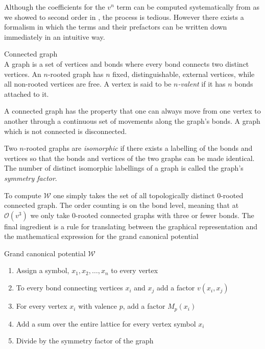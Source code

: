 Although the coefficients for the $v^n$ term can be computed systematically from
  as we showed to second order in
, the process is tedious. However there
exists a formalism in which the terms and their prefactors can be written down
immediately in an intuitive way.
%
\begin{definition}{Connected graph}\label{def:graph}\\
  A graph is a set of vertices and bonds where every bond connects two distinct
  vertices. An $n$-rooted graph has $n$ fixed, distinguishable, external
  vertices, while all non-rooted vertices are free. A vertex is said to be
  \emph{$n$-valent} if it has $n$ bonds attached to it.

  A connected graph has the property that one can always move from one vertex to
  another through a continuous set of movements along the graph's bonds. A graph
  which is not connected is disconnected.

  Two $n$-rooted graphs are \emph{isomorphic} if there exists a labelling of the
  bonds and vertices so that the bonds and vertices of the two graphs can be
  made identical. The number of distinct isomorphic labellings of a graph is
  called the graph's \emph{symmetry factor}.
\end{definition}
%
\noindent{}%
To compute $\mathcal{W}$ one simply takes the set of all topologically distinct
$0$-rooted connected graph. The order counting is on the bond level, meaning
that at $\mathcal{O}(v^3)$ we only take $0$-rooted connected graphs with three
or fewer bonds. The final ingredient is a rule for translating between the
graphical representation and the mathematical expression for the grand canonical
potential
%
\begin{ruledef}{Grand canonical potential $\mathcal{W}$} \label{rule:free_energy}
  \begin{enumerate}
    \item Assign a symbol, $x_1, x_2, \dots, x_n$ to every vertex
    \item To every bond connecting vertices $x_i$ and $x_j$ add a factor
      $v(x_i,x_j)$
    \item For every vertex $x_i$ with valence $p$, add a factor $M_p(x_i)$
    \item Add a sum over the entire lattice for every vertex symbol $x_i$
    \item Divide by the symmetry factor of the graph
  \end{enumerate}
\end{ruledef}
